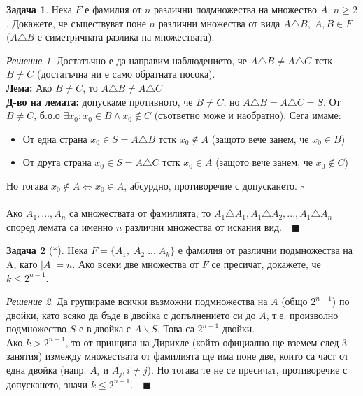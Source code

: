 \documentclass[10pt, a4paper]{article}
\theoremstyle{definition}
\newtheorem{problem}{Задача}
\theoremstyle{remark}
\newtheorem*{sol}{Решение}
\begin{document}
\hfill
\begin{problem}
    Нека \(F\) е фамилия от \(n\) различни подмножества на множество \(A\), \(n\geq 2\). Докажете, че съществуват поне \(n\) различни множества от вида \(A\triangle B,\;A,B\in F\) (\(A\triangle B\) е симетричната разлика на множествата).
\end{problem}
\begin{sol}
    Достатъчно е да направим наблюдението, че \(A\triangle B \neq A\triangle C\) тстк \(B\neq C\) (достатъчна ни е само обратната посока).\\ 
    \textbf{Лема:} Ако $B\neq C$, то $A\triangle B \neq A\triangle C$\\
    \textbf{Д-во на лемата:} допускаме противното, че $B\neq C$, но $A\triangle B = A\triangle C=S$. От $B\neq C$, б.о.о $\exists x_0: x_0\in B\wedge x_0\notin C$ (съответно може и наобратно). Сега имаме:
    \begin{itemize}
        \item От една страна $x_0\in S=A\triangle B$ тстк $x_0\notin A$ (защото вече занем, че $x_0\in B$)
        \item От друга страна $x_0\in S=A\triangle C$ тстк $x_0\in A$ (защото вече занем, че $x_0\notin C$)
    \end{itemize}
    Но тогава $x_0\notin A \Leftrightarrow x_0\in A$, абсурдно, противоречие с допускането. $\square$\\
    \\Ако \(A_1,...,A_n\) са множествата от фамилията, то \(A_1\triangle A_1, A_1\triangle A_2, ...,A_1\triangle A_n\) според лемата са именно \(n\) различни множества от искания вид.\(\quad\blacksquare\)
\end{sol}

\hfill
\begin{problem}[*]
    Нека \(F=\{A_1,\;A_2\;...\;A_k\}\) е фамилия от различни подмножества на A, като \(|A|=n\). Ако всеки две множества от \(F\) се пресичат, докажете, че \(k\leq 2^{n-1}\).
\end{problem}
\begin{sol}
    Да групираме всички възможни подмножества на \(A\) (общо $2^{n-1}$) по двойки, като всяко да бъде в двойка с допълнението си до \(A\), т.е. произволно подмножество $S$ е в двойка с \(A\backslash S\). Това са $2^{n-1}$ двойки.\\Ако $k>2^{n-1}$, то от принципа на Дирихле (който официално ще вземем след 3 занятия) измежду множествата от фамилията ще има поне две, които са част от една двойка (напр. $A_i$ и $A_j, i\neq j$). Но тогава те не се пресичат, противоречие с допускането, значи $k\leq 2^{n-1}.\quad\blacksquare$
\end{sol}
\end{document}
